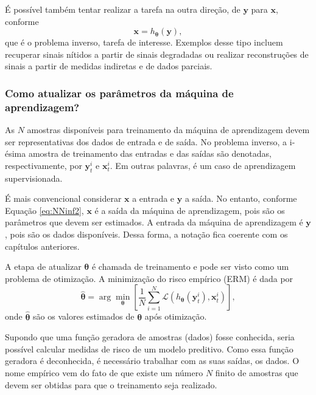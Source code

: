 É possível também tentar realizar a tarefa na outra direção, de $\mathbf{y}$ para $\mathbf{x}$,  conforme 
\begin{equation}
\mathbf{x} = h_{\bm{\theta}}(\mathbf{y}),
\label{eq:NNinf2}
\end{equation}
que é o problema inverso, tarefa de interesse.  Exemplos desse tipo incluem recuperar sinais nítidos a partir de sinais degradadas ou realizar reconstruções de sinais a partir de medidas indiretas e de dados parciais. 






\subsubsection{Como atualizar os parâmetros da máquina de aprendizagem?}


As $N$ amostras disponíveis para treinamento da máquina de aprendizagem devem ser representativas dos dados de entrada e de saída. No problema inverso, a i-ésima amostra de treinamento das entradas e das saídas são denotadas, respectivamente, por $\mathbf{y}_t^{i}$ e $\mathbf{x}_t^{i}$. Em outras palavras, é um caso de aprendizagem supervisionada. 

É mais convencional considerar $\mathbf{x}$ a entrada e  $\mathbf{y}$ a saída. No entanto, conforme Equação \eqref{eq:NNinf2},  $\mathbf{x}$ é a  saída da máquina de aprendizagem, pois são os parâmetros que devem ser estimados. A entrada da máquina de aprendizagem é $\mathbf{y}$, pois são os dados disponíveis. Dessa forma, a notação fica coerente com os capítulos anteriores. 

A etapa de atualizar $\bm{\theta}$ é chamada de treinamento e pode ser visto como um problema de otimização. A minimização do risco empírico (ERM) é dada por
\begin{equation}
\hat{\bm{\theta}} = \arg\min\limits_{\bm{\theta}} \left[ \frac{1}{N} \sum_{i=1}^{N} \mathcal{L} \left(h_{\bm{\theta}}(\mathbf{y}_t^{i}), \mathbf{x}_t^{i} \right) \right], 
\label{eq:ERM0}
\end{equation}
onde $\hat{\bm{\theta}}$ são os valores estimados de $\bm{\theta}$ após otimização. 

Supondo que uma função geradora de amostras (dados) fosse conhecida, seria possível calcular medidas de risco de um modelo preditivo. Como essa função geradora é deconhecida, é necessário trabalhar com as suas saídas, os dados. O nome empírico vem do fato de que existe um número $N$ finito de amostras que devem ser obtidas para que o treinamento seja realizado. 



